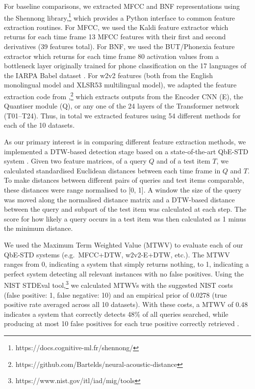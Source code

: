 \documentclass{article}
\begin{document}
For baseline comparisons, we extracted MFCC and BNF representations using the Shennong library,\footnote{https://docs.cognitive-ml.fr/shennong/} which provides a Python interface to common feature extraction routines.
For MFCC, we used the Kaldi feature extractor which returns for each time frame 13 MFCC features with their first and second derivatives (39 features total). 
For BNF, we used the BUT/Phonexia feature extractor which returns for each time frame 80 activation values from a bottleneck layer originally trained for phone classification on the 17 languages of the IARPA Babel dataset \cite{silnovaPhonexiaBottleneckFeature2018}.
For w2v2 features (both from the English monolingual model and XLSR53 multilingual model), we adapted the feature extraction code from \cite{bartelds2020neural},\footnote{https://github.com/Bartelds/neural-acoustic-distance} which extracts outputs from the Encoder CNN (E), the Quantiser module (Q), or any one of the 24 layers of the Transformer network (T01--T24).
Thus, in total we extracted features using 54 different methods for each of the 10 datasets.

As our primary interest is in comparing different feature extraction methods, we implemented a DTW-based detection stage based on a state-of-the-art QbE-STD system \cite{rodriguez-fuentesHighperformanceQuerybyexampleSpoken2014}.
Given two feature matrices, of a query $Q$ and of a test item $T$, we calculated standardised Euclidean distances between each time frame in $Q$ and $T$.
To make distances between different pairs of queries and test items comparable, these distances were range normalised to [0, 1].
A window the size of the query was moved along the normalised distance matrix and a DTW-based distance between the query and subpart of the test item was calculated at each step.
The score for how likely a query occurs in a test item was then calculated as 1 minus the minimum distance.

We used the Maximum Term Weighted Value (MTWV) to evaluate each of our QbE-STD systems (e.g.~MFCC+DTW, w2v2-E+DTW, etc.).
The MTWV ranges from 0, indicating a system that simply returns nothing, to 1, indicating a perfect system detecting all relevant instances with no false positives.
Using the NIST STDEval tool,\footnote{https://www.nist.gov/itl/iad/mig/tools} we calculated MTWVs with the suggested NIST costs (false positive: 1, false negative: 10) and an empirical prior of 0.0278 (true positive rate averaged across all 10 datasets).
With these costs, a MTWV of 0.48 indicates a system that correctly detects 48\% of all queries searched, while producing at most 10 false positives for each true positive correctly retrieved \cite{whiteUsingZeroresourceSpoken2015}.
\end{document}
